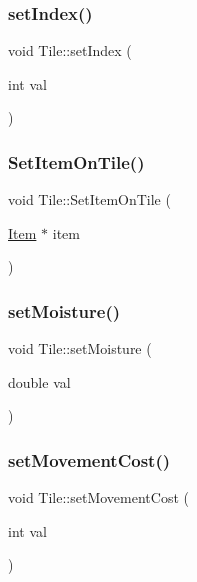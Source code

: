 \mbox{\label{class_tile_a49ca97352b3886f7e670c855bde21deb}} 
\subsubsection{\texorpdfstring{set\+Index()}{setIndex()}}
{\footnotesize\ttfamily void Tile\+::set\+Index (\begin{DoxyParamCaption}\item[{int}]{val }\end{DoxyParamCaption})}

\mbox{\label{class_tile_aa53f4f2b54ce9a66abf75284a304c1df}} 
\subsubsection{\texorpdfstring{Set\+Item\+On\+Tile()}{SetItemOnTile()}}
{\footnotesize\ttfamily void Tile\+::\+Set\+Item\+On\+Tile (\begin{DoxyParamCaption}\item[{\mbox{\hyperlink{class_item}{Item}} $\ast$}]{item }\end{DoxyParamCaption})}

\mbox{\label{class_tile_a8dc53f1b24e6dee587664ced90c3ac79}} 
\subsubsection{\texorpdfstring{set\+Moisture()}{setMoisture()}}
{\footnotesize\ttfamily void Tile\+::set\+Moisture (\begin{DoxyParamCaption}\item[{double}]{val }\end{DoxyParamCaption})}

\mbox{\label{class_tile_a825e527d44d08cd73b354d214eaa189d}} 
\subsubsection{\texorpdfstring{set\+Movement\+Cost()}{setMovementCost()}}
{\footnotesize\ttfamily void Tile\+::set\+Movement\+Cost (\begin{DoxyParamCaption}\item[{int}]{val }\end{DoxyParamCaption})}

